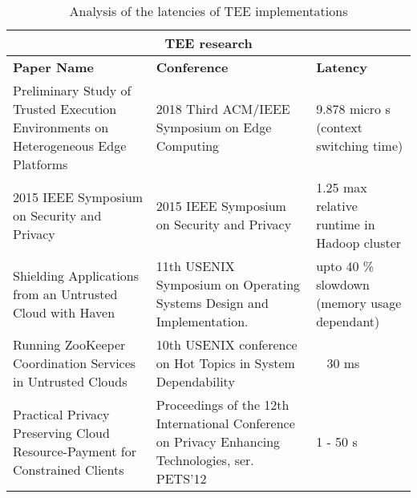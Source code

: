 \documentclass[conference]{IEEEtran}
\begin{document}
\begin{table*}[t]
    \centering
    \caption{Analysis of the latencies of TEE implementations}

    \begin{center}
        \begin{tabular}{ |p{}||p{}|p{}|  }
            \hline
            \multicolumn{3}{|c|}{TEE research}                                                                                                                                                                                                                                                                \\
            \hline
            \textbf{Paper Name }                                                                       & \textbf{Conference}                                                                                                                   & \textbf{Latency}                                             \\
            \hline
            Preliminary Study of Trusted Execution Environments on Heterogeneous Edge Platforms        & 2018 Third ACM/IEEE Symposium on Edge Computing                                                                                       & 9.878 micro s (context switching time)                       \\ \hline
            2015 IEEE Symposium on Security and Privacy                                                & 2015 IEEE Symposium on Security and Privacy                                                                                           & 1.25 max relative runtime in Hadoop cluster                  \\ \hline
            Shielding Applications from an Untrusted Cloud with Haven                                  & 11th USENIX Symposium on Operating Systems Design and Implementation.                                                                 & upto 40 \% slowdown (memory usage dependant)                 \\ \hline
            Running ZooKeeper Coordination Services in Untrusted Clouds                                & 10th USENIX conference on Hot Topics in System Dependability                                                                          & ~ 30 ms                                                      \\ \hline
            Practical Privacy Preserving Cloud Resource-Payment for Constrained Clients                & Proceedings of the 12th International Conference on Privacy Enhancing Technologies, ser. PETS’12                                      & 1 - 50 s                                                     \\ \hline

\end{tabular}
\end{center}
\end{table*}
\end{document}
